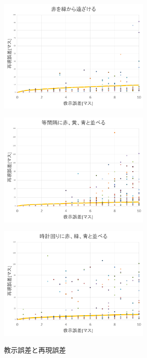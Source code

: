\begin{figure}[h]
\begin{minipage}[t]{.49\textwidth}
		\label{subfigure:unit_c}
	\end{minipage}
	\begin{minipage}[t]{.49\textwidth}
		\centering
		\includegraphics[width=7.5cm]{スライド5.PNG} \\ %
		\label{subfigure:unit_d}
	\end{minipage}
	\begin{minipage}[t]{.49\textwidth}
		\centering
		\includegraphics[width=7.5cm]{スライド6.PNG} \\ %
		\label{subfigure:unit_d}
	\end{minipage}
	\begin{minipage}[t]{.49\textwidth}
		\centering
		\includegraphics[width=7.5cm]{スライド7.PNG} \\ %
		\label{subfigure:unit_d}
	\end{minipage}
	\caption{教示誤差と再現誤差}
	\label{figure:errors}
\end{figure}
